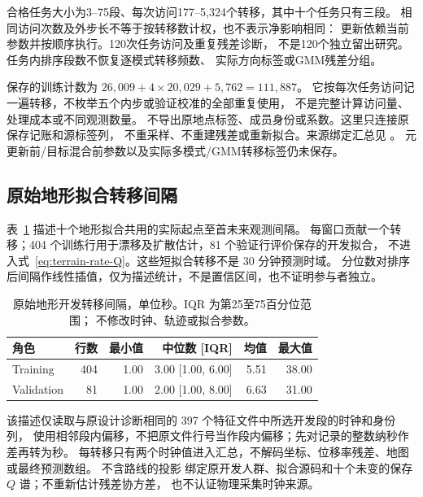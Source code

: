 \documentclass[UTF8,11pt]{ctexart}
\begin{document}
合格任务大小为3--75段、每次访问177--5,324个转移，其中十个任务只有三段。
相同访问次数及外步长不等于按转移数计权，也不表示净影响相同：
更新依赖当前参数并按顺序执行。120次任务访问及重复残差诊断，
不是120个独立留出研究。任务内排序段数不恢复逐模式转移频数、
实际方向标签或GMM残差分组。

保存的训练计数为
$26{,}009+4\times20{,}029+5{,}762=111{,}887$。
它按每次任务访问记一遍转移，不枚举五个内步或验证校准的全部重复使用，
不是完整计算访问量、处理成本或不同观测数量。
不导出原地点标签、成员身份或系数。这里只连接原保存记账和源标签列，
不重采样、不重建残差或重新拟合。来源绑定汇总见
。
元更新前/目标混合前参数以及实际多模式/GMM转移标签仍未保存。

\subsection{原始地形拟合转移间隔}
\label{sec:terrain-fit-intervals}
表~\ref{tab:terrain-fit-intervals} 描述十个地形拟合共用的实际起点至首未来观测间隔。
每窗口贡献一个转移；404 个训练行用于漂移及扩散估计，81 个验证行评价保存的开发拟合，
不进入式~\eqref{eq:terrain-rate-Q}。这些短拟合转移不是 30 分钟预测时域。
分位数对排序后间隔作线性插值，仅为描述统计，不是置信区间，也不证明参与者独立。

\begin{table}[htbp]
\centering\footnotesize
\caption{原始地形开发转移间隔，单位秒。IQR 为第25至75百分位范围；
不修改时钟、轨迹或拟合参数。}
\label{tab:terrain-fit-intervals}
\begin{tabular}{lrrrrr}
\toprule
角色 & 行数 & 最小值 & 中位数 [IQR] & 均值 & 最大值\\
\midrule
Training & 404 & 1.00 & 3.00 [1.00, 6.00] & 5.51 & 38.00\\
Validation & 81 & 1.00 & 2.00 [1.00, 8.00] & 6.63 & 31.00\\
\bottomrule
\end{tabular}
\end{table}

该描述仅读取与原设计诊断相同的 397 个特征文件中所选开发段的时钟和身份列，
使用相邻段内偏移，不把原文件行号当作段内偏移；先对记录的整数纳秒作差再转为秒。
每转移只有两个时钟值进入汇总，不解码坐标、位移率残差、地图或最终预测数组。
不含路线的投影 
绑定原开发人群、拟合源码和十个未变的保存 $Q$ 谱；不重新估计残差协方差，
也不认证物理采集时钟来源。
\end{document}
